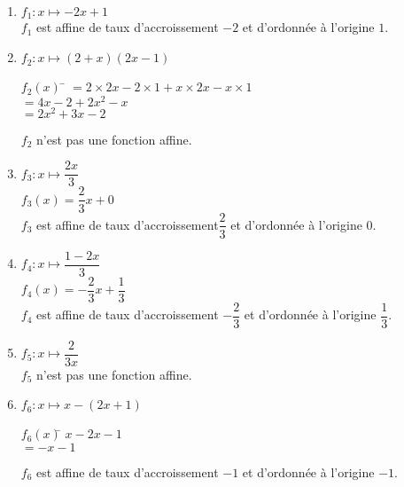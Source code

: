 \documentclass[a4paper,11pt,exos]{nsi} %
\begin{document}
\exo{}
	\begin{enumerate}
		\item 	$f_1:x\mapsto-2x+1$\\
		$f_1$ est affine de taux d'accroissement $-2$ et d'ordonnée à l'origine $1$.
		\item 	$f_2:x\mapsto(2+x)(2x-1)$
		\begin{tabbing}
            $f_2(x)$ \= $=2\times 2x-2\times 1+x\times 2x-x\times 1$\\
            \>  $=4x-2+2x^2-x$\\
            \>  $=2x^2+3x-2$
        \end{tabbing}
        $f_2$ n'est pas une fonction affine.
		\item	$f_3:x\mapsto\dfrac{2x}{3}$\\
		$f_3(x)=\dfrac{2}{3}x+0$\\
        $f_3$ est affine de taux d'accroissement$\dfrac{2}{3}$ et d'ordonnée à l'origine $0$.
		\item	$f_4:x\mapsto\dfrac{1-2x}{3}$\\
		$f_4(x)=-\dfrac{2}{3}x+\dfrac{1}{3}$\\
        $f_4$ est affine de taux d'accroissement $-\dfrac{2}{3}$ et d'ordonnée à l'origine $\dfrac{1}{3}$.
		\item	$f_5:x\mapsto\dfrac{2}{3x}$\\
		$f_5$ n'est pas une fonction affine.
		\item	$f_6:x\mapsto x-(2x+1)$
		\begin{tabbing}
            $f_6(x)$\=  $x-2x-1$\\
            \>  $=-x-1$
        \end{tabbing}
        $f_6$ est affine de taux d'accroissement $-1$ et d'ordonnée à l'origine $-1$.
	\end{enumerate}




\exo{}
\end{document}

